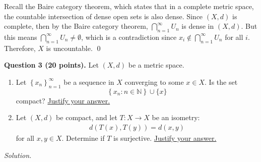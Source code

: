 \documentclass[11pt]{amsart}
\theoremstyle{plain}
\numberwithin{equation}{section}
\begin{document}
\begin{enumerate}[label=\textbf{(\alph*)}]
\begin{enumerate}[label=\textbf{(\roman*)}]
\newline
\newline Recall the Baire category theorem, which states that in a complete metric space, the countable intersection of dense open sets is also dense. Since $(X,d)$ is complete, then by the Baire category theorem, $\bigcap_{n=1}^{\infty}U_{n}$ is dense in $(X,d)$. But this means $\bigcap_{n=1}^{\infty}U_{n}\neq\emptyset$, which is a contradiction since $x_{i}\not\in\bigcap_{n=1}^{\infty}U_{n}$ for all $i$. Therefore, $X$ is uncountable. \qed 
\end{enumerate}
\end{enumerate}
\noindent\textbf{Question 3 (20 points).} Let $(X,d)$ be a metric space.
\begin{enumerate}[label=\textbf{(\alph*)}]
    \itemsep 0em
    \item  Let $\left\{x_{n}\right\}_{n=1}^{\infty}$ be a sequence in $X$ converging to some $x\in X$. Is the set \[\left\{x_{n}:n\in\mathbb{N}\right\}\cup\{x\}\] compact? \underline{Justify your answer.}
    \item Let $(X,d)$ be compact, and let $T:X\longrightarrow X$ be an isometry:
\begin{align*}
    d\left(T(x),T(y)\right)=d(x,y)
\end{align*}
for all $x,y\in X$. Determine if $T$ is surjective. \underline{Justify your answer.}
\end{enumerate}
\noindent\emph{Solution.}
\end{document}
